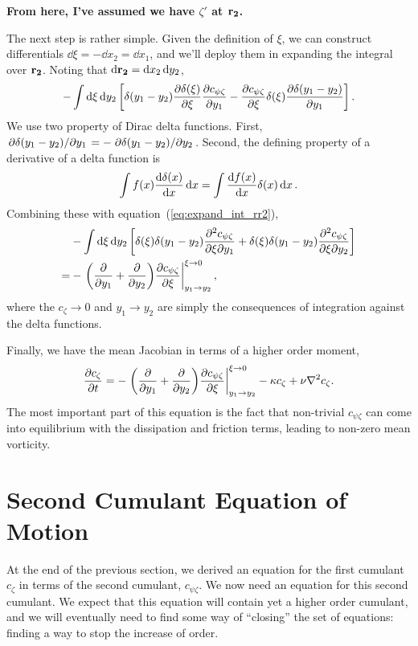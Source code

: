 \documentclass{paper}
\newcommand{\cz}{c_\zeta}
\newcommand{\cpz}{c_{\psi\zeta}}
\newcommand{\rr}[1]{\vb{r_{#1}}}
\begin{document}
\textbf{From here, I've assumed we have $\zeta'$ at $\rr2$.}

The next step is rather simple. Given the definition of $\xi$, we can construct differentials $\dd{\xi} = -\dd{x_2} = \dd{x_1}$, and we'll deploy them in expanding the integral over $\rr2$. Noting that $\dd{\rr2} = \dd{x_2}\dd{y_2}$,
\begin{equation}
  \label{eq:expand_int_rr2}
  - \int \dd{\xi} \dd{y_2} \left[ \delta(y_1 - y_2)\pdv{\delta(\xi)}{\xi} \pdv{\cpz}{y_1} - \pdv{\cpz}{\xi} \delta(\xi)\pdv{\delta(y_1 - y_2)}{y_1}\right].
\end{equation}
We use two property of Dirac delta functions. First, $\pdv*{\delta(y_1 - y_2)}{y_1} = -\pdv*{\delta(y_1 - y_2)}{y_2}$. Second, the defining property of a derivative of a delta function is
\begin{equation}
  \label{eq:dirac_derivative}
  \int f(x) \dv{\delta(x)}{x} \dd{x} = \int \dv{f(x)}{x} \delta(x) \dd{x}.
\end{equation}
Combining these with equation~(\ref{eq:expand_int_rr2}),
\begin{equation}
  \label{eq:expand_int_rr2_dirac}
  \begin{split}
    & - \int \dd{\xi} \dd{y_2} \left[ \delta(\xi)\delta(y_1 - y_2)\pdv{\cpz}{\xi}{y_1} + \delta(\xi)\delta(y_1 - y_2)\pdv{\cpz}{\xi}{y_2}\right]\\
    = & -\eval{\qty(\pdv{y_1} + \pdv{y_2}) \pdv{\cpz}{\xi}}_{y_1 \to y_2}^{\xi \to 0},
  \end{split}
\end{equation}
where the $\cz \to 0$ and $y_1 \to y_2$ are simply the consequences of integration against the delta functions.

Finally, we have the mean Jacobian in terms of a higher order moment,
\begin{equation}
  \label{eq:first_cumulant_EOM}
  \pdv{\cz}{t} = -\eval{\qty(\pdv{y_1} + \pdv{y_2}) \pdv{\cpz}{\xi}}_{y_1 \to y_2}^{\xi \to 0} - \kappa \cz + \nu \laplacian{\cz}.
\end{equation}
The most important part of this equation is the fact that non-trivial $\cpz$ can come into equilibrium with the dissipation and friction terms, leading to non-zero mean vorticity.

\section{Second Cumulant Equation of Motion}
\label{sec:second-cumul-equat}
At the end of the previous section, we derived an equation for the first cumulant $\cz$ in terms of the second cumulant, $\cpz$. We now need an equation for this second cumulant. We expect that this equation will contain yet a higher order cumulant, and we will eventually need to find some way of ``closing'' the set of equations: finding a way to stop the increase of order.
\end{document}
